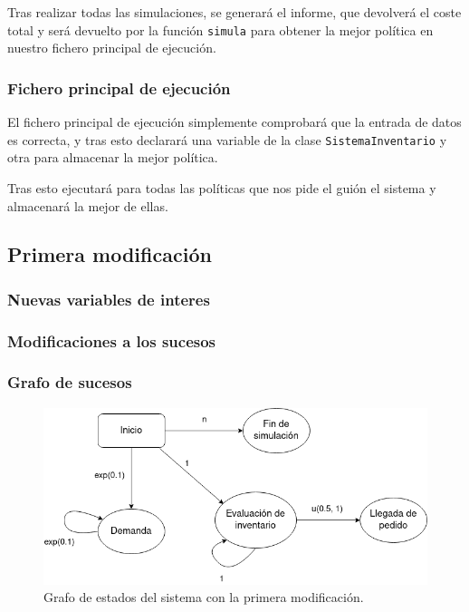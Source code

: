 \documentclass[12pt, spanish]{article}
\begin{document}
Tras realizar todas las simulaciones, se generará el informe, que devolverá el coste total y será devuelto por la función \texttt{simula} para obtener la mejor política en nuestro fichero principal de ejecución.

\subsubsection{Fichero principal de ejecución}

El fichero principal de ejecución simplemente comprobará que la entrada de datos es correcta, y tras esto declarará una variable de la clase \texttt{SistemaInventario} y otra para almacenar la mejor política.

Tras esto ejecutará para todas las políticas que nos pide el guión el sistema y almacenará la mejor de ellas.

\subsection{Primera modificación}



\subsubsection{Nuevas variables de interes}

\subsubsection{Modificaciones a los sucesos}

\subsubsection{Grafo de sucesos}


\begin{figure}[H]
  \centering
   \includegraphics[width=\textwidth]{grafo_sucesos_mod1.png}
	\caption{Grafo de estados del sistema con la primera modificación.}
\end{figure}
\end{document}
